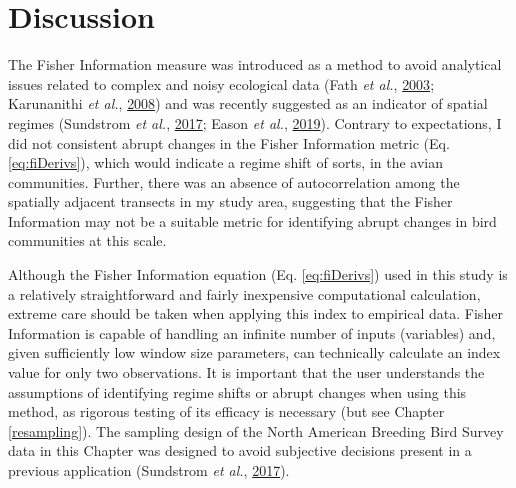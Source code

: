 \documentclass[12pt,twoside,openany]{reedthesis}
\begin{document}
\hypertarget{discussion-2}{%
\section{Discussion}\label{discussion-2}}

The Fisher Information measure was introduced as a method to avoid analytical issues related to complex and noisy ecological data (Fath \emph{et al.}, \protect\hyperlink{ref-fath_regime_2003}{2003}; Karunanithi \emph{et al.}, \protect\hyperlink{ref-karunanithi_detection_2008}{2008}) and was recently suggested as an indicator of spatial regimes (Sundstrom \emph{et al.}, \protect\hyperlink{ref-sundstrom2017detecting}{2017}; Eason \emph{et al.}, \protect\hyperlink{ref-eason2019information}{2019}). Contrary to expectations, I did not consistent abrupt changes in the Fisher Information metric (Eq. \eqref{eq:fiDerivs}), which would indicate a regime shift of sorts, in the avian communities. Further, there was an absence of autocorrelation among the spatially adjacent transects in my study area, suggesting that the Fisher Information may not be a suitable metric for identifying abrupt changes in bird communities at this scale.

Although the Fisher Information equation (Eq. \eqref{eq:fiDerivs}) used in this study is a relatively straightforward and fairly inexpensive computational calculation, extreme care should be taken when applying this index to empirical data. Fisher Information is capable of handling an infinite number of inputs (variables) and, given sufficiently low window size parameters, can technically calculate an index value for only two observations. It is important that the user understands the assumptions of identifying regime shifts or abrupt changes when using this method, as rigorous testing of its efficacy is necessary (but see Chapter \ref{resampling}). The sampling design of the North American Breeding Bird Survey data in this Chapter was designed to avoid subjective decisions present in a previous application (Sundstrom \emph{et al.}, \protect\hyperlink{ref-sundstrom2017detecting}{2017}).
\end{document}
